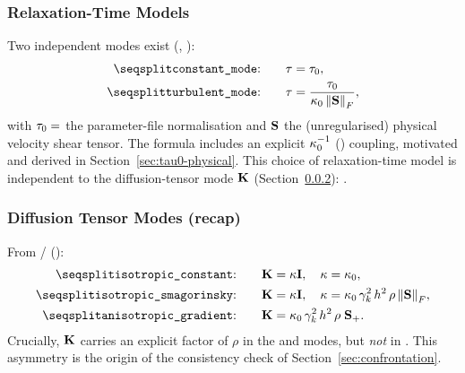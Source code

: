 \subsubsection{Relaxation-Time Models}
\label{sec:tau-modes}
Two independent modes exist
(, ):
\begin{align}
  \text{\code{constant\_mode}:} \qquad & \taurelax = \taurelax_0 , \\
  \text{\code{turbulent\_mode}:} \qquad & \taurelax = \frac{\taurelax_0}{\kappaC\,\norm{\Shear}_F} ,
  \label{eq:tau_turbulent}
\end{align}
with $\tau_0=$ the parameter-file normalisation
and $\mathbf{S}$ the (unregularised) physical velocity shear tensor. The
 formula includes an explicit $\kappa_{0}^{-1}$
() coupling, motivated and derived
in Section~\ref{sec:tau0-physical}. This choice of relaxation-time model is
independent to the diffusion-tensor mode $\mathbf{K}$
(Section~\ref{sec:diffusion-tensor-recap}): .

\subsubsection{Diffusion Tensor Modes (recap)}
\label{sec:diffusion-tensor-recap}
From /
():
\begin{align}
  \text{\code{isotropic\_constant}:} \qquad & \Kmat=\kappaP\mathbf I, \quad \kappaP=\kappaC, \\
  \text{\code{isotropic\_smagorinsky}:} \qquad & \Kmat=\kappaP\mathbf I, \quad \kappaP=\kappaC\,\gammak^2\,h^2\,\rho\,\norm{\Shear}_F, \\
  \text{\code{anisotropic\_gradient}:} \qquad & \Kmat = \kappaC\,\gammak^2\,h^2\,\rho \; \Splus .
\end{align}
Crucially, $\mathbf{K}$ carries an explicit factor of $\rho$ in the
 and  modes, but
\emph{not} in . This asymmetry is the origin of
the consistency check of Section~\ref{sec:confrontation}.

